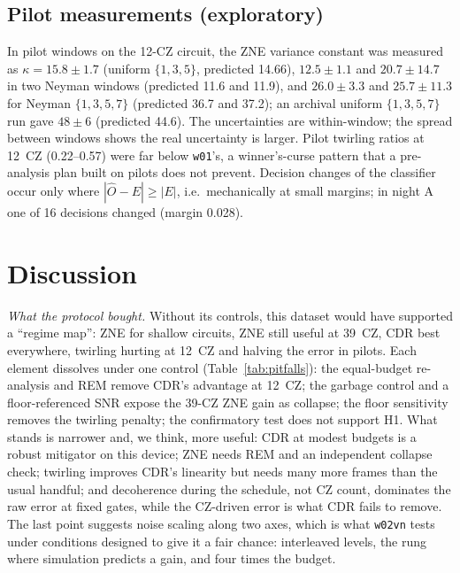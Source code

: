 \documentclass[conference]{IEEEtran}
\begin{document}
\subsection{Pilot measurements (exploratory)}
In pilot windows on the 12-CZ circuit, the ZNE variance constant was measured as
$\kappa=15.8\pm1.7$ (uniform $\{1,3,5\}$, predicted 14.66), $12.5\pm1.1$ and $20.7\pm14.7$ in two
Neyman windows (predicted 11.6 and 11.9), and $26.0\pm3.3$ and $25.7\pm11.3$ for Neyman
$\{1,3,5,7\}$ (predicted 36.7 and 37.2); an archival uniform $\{1,3,5,7\}$ run gave $48\pm6$
(predicted 44.6). The uncertainties are within-window; the spread between windows shows the
real uncertainty is larger. Pilot twirling ratios at 12~CZ (0.22--0.57) were far below
\texttt{w01}'s, a winner's-curse pattern that a pre-analysis plan built on pilots does not
prevent. Decision changes of the classifier occur only where $|\hat O-E|\ge|E|$, i.e.\
mechanically at small margins; in night A one of 16 decisions changed (margin 0.028).

\section{Discussion}\label{sec:discussion}

\emph{What the protocol bought.} Without its controls, this dataset would have supported a
``regime map'': ZNE for shallow circuits, ZNE still useful at 39~CZ, CDR best everywhere,
twirling hurting at 12~CZ and halving the error in pilots. Each element dissolves under one
control (Table~\ref{tab:pitfalls}): the equal-budget re-analysis and REM remove CDR's advantage
at 12~CZ; the garbage control and a floor-referenced SNR expose the 39-CZ ZNE gain as collapse;
the floor sensitivity removes the twirling penalty; the confirmatory test does not support
H1. What stands is narrower and, we think, more useful: CDR at modest budgets is a robust
mitigator on this device; ZNE needs REM and an independent collapse check; twirling improves
CDR's linearity but needs many more frames than the usual handful; and decoherence during the
schedule, not CZ count, dominates the raw error at fixed gates, while the CZ-driven error is
what CDR fails to remove. The last point suggests noise scaling along two axes, which is what
\texttt{w02vn} tests under conditions designed to give it a fair chance: interleaved levels,
the rung where simulation predicts a gain, and four times the budget.
\end{document}
